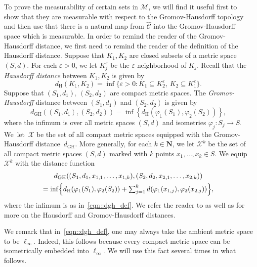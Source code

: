 \documentclass[10pt]{amsart}
\let\mathcal\mathscr
\let\epsilon\varepsilon
\theoremstyle{plain}
\numberwithin{theorem}{section}
\theoremstyle{definition}
\newcommand\mmspace{{\mathcal M}}
\newcommand{\compactmatrix}{\mathcal C}
\newcommand{\N}{\mathbf{N}}
\newcommand{\gh}{{\mathcal X}}
\newcommand{\dgh}{d_{\mathrm {GH}}}
\renewcommand{\dh}{d_{\mathrm{H}}}
\let\wh\widehat
\begin{document}
To prove the measurability of certain sets in $\mmspace$, we will find it useful first to show that they are measurable with respect to the Gromov-Hausdorff topology and then use that there is a natural map from $\wh{\compactmatrix}$ into the Gromov-Hausdorff space which is measurable. In order to remind the reader of the Gromov-Hausdorff distance, we first need to remind the reader of the definition of the Hausdorff distance. Suppose that $K_1,K_2$ are closed subsets of a metric space $(S,d)$. For each $\epsilon > 0$, we let $K_j^\epsilon$ be the $\epsilon$-neighborhood of $K_j$. Recall that the \emph{Hausdorff distance} between $K_1,K_2$ is given by
\begin{equation}
\label{eqn::h_def}
\dh(K_1,K_2) = \inf\{ \epsilon >0 : K_1 \subseteq K_2^\epsilon,\ K_2 \subseteq K_1^\epsilon\}.
\end{equation}
Suppose that $(S_1,d_1)$, $(S_2,d_2)$ are compact metric spaces. The \emph{Gromov-Hausdorff} distance between $(S_1,d_1)$ and $(S_2,d_2)$ is given by
\begin{equation}
\label{eqn::dgh_def}
\dgh((S_1,d_1),(S_2,d_2)) = \inf\left\{ \dh(\varphi_1(S_1),\varphi_2(S_2)) \right\},
\end{equation}
where the infimum is over all metric spaces $(S,d)$ and isometries $\varphi_j \colon S_j \to S$. We~let~$\gh$ be the set of all compact metric spaces equipped with the Gromov-Hausdorff distance~$\dgh$. More generally, for each $k \in \N$, we let $\gh^k$ be the set of all compact metric spaces $(S,d)$ marked with $k$ points $x_1,\ldots,x_k \in S$. We equip $\gh^k$ with the distance function
\begin{multline}
\label{eqn::dghk_def}
\dgh((S_1,d_1,x_{1,1},\ldots,x_{1,k}),(S_2,d_2,x_{2,1},\ldots,x_{2,k}))\\
=\textstyle \inf\Bigl\{ \dh(\varphi_1(S_1),\varphi_2(S_2)) + \sum_{j=1}^k d(\varphi_1(x_{1,j}),\varphi_2(x_{2,j})) \Bigr\},
\end{multline}
where the infimum is as in~\eqref{eqn::dgh_def}. We refer the reader to \cite[Chap.\,27]{villanibook} as well as \cite[Chap.\,7]{courseinmetricgeometry} for more on the Hausdorff and Gromov-Hausdorff distances.

We remark that in~\eqref{eqn::dgh_def}, one may always take the ambient metric space to be $\ell_\infty$. Indeed, this follows because every compact metric space can be isometrically embedded into $\ell_\infty$. We will use this fact several times in what follows.
\end{document}
